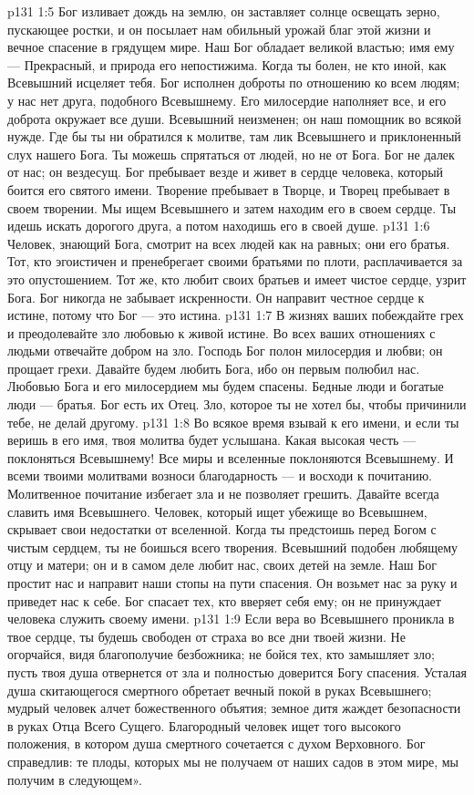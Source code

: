 \vs p131 1:5 Бог изливает дождь на землю, он заставляет солнце освещать зерно, пускающее ростки, и он посылает нам обильный урожай благ этой жизни и вечное спасение в грядущем мире. Наш Бог обладает великой властью; имя ему --- Прекрасный, и природа его непостижима. Когда ты болен, не кто иной, как Всевышний исцеляет тебя. Бог исполнен доброты по отношению ко всем людям; у нас нет друга, подобного Всевышнему. Его милосердие наполняет все, и его доброта окружает все души. Всевышний неизменен; он наш помощник во всякой нужде. Где бы ты ни обратился к молитве, там лик Всевышнего и приклоненный слух нашего Бога. Ты можешь спрятаться от людей, но не от Бога. Бог не далек от нас; он вездесущ. Бог пребывает везде и живет в сердце человека, который боится его святого имени. Творение пребывает в Творце, и Творец пребывает в своем творении. Мы ищем Всевышнего и затем находим его в своем сердце. Ты идешь искать дорогого друга, а потом находишь его в своей душе.
\vs p131 1:6 Человек, знающий Бога, смотрит на всех людей как на равных; они его братья. Тот, кто эгоистичен и пренебрегает своими братьями по плоти, расплачивается за это опустошением. Тот же, кто любит своих братьев и имеет чистое сердце, узрит Бога. Бог никогда не забывает искренности. Он направит честное сердце к истине, потому что Бог --- это истина.
\vs p131 1:7 В жизнях ваших побеждайте грех и преодолевайте зло любовью к живой истине. Во всех ваших отношениях с людьми отвечайте добром на зло. Господь Бог полон милосердия и любви; он прощает грехи. Давайте будем любить Бога, ибо он первым полюбил нас. Любовью Бога и его милосердием мы будем спасены. Бедные люди и богатые люди --- братья. Бог есть их Отец. Зло, которое ты не хотел бы, чтобы причинили тебе, не делай другому.
\vs p131 1:8 Во всякое время взывай к его имени, и если ты веришь в его имя, твоя молитва будет услышана. Какая высокая честь --- поклоняться Всевышнему! Все миры и вселенные поклоняются Всевышнему. И всеми твоими молитвами возноси благодарность --- и восходи к почитанию. Молитвенное почитание избегает зла и не позволяет грешить. Давайте всегда славить имя Всевышнего. Человек, который ищет убежище во Всевышнем, скрывает свои недостатки от вселенной. Когда ты предстоишь перед Богом с чистым сердцем, ты не боишься всего творения. Всевышний подобен любящему отцу и матери; он и в самом деле любит нас, своих детей на земле. Наш Бог простит нас и направит наши стопы на пути спасения. Он возьмет нас за руку и приведет нас к себе. Бог спасает тех, кто вверяет себя ему; он не принуждает человека служить своему имени.
\vs p131 1:9 Если вера во Всевышнего проникла в твое сердце, ты будешь свободен от страха во все дни твоей жизни. Не огорчайся, видя благополучие безбожника; не бойся тех, кто замышляет зло; пусть твоя душа отвернется от зла и полностью доверится Богу спасения. Усталая душа скитающегося смертного обретает вечный покой в руках Всевышнего; мудрый человек алчет божественного объятия; земное дитя жаждет безопасности в руках Отца Всего Сущего. Благородный человек ищет того высокого положения, в котором душа смертного сочетается с духом Верховного. Бог справедлив: те плоды, которых мы не получаем от наших садов в этом мире, мы получим в следующем».
